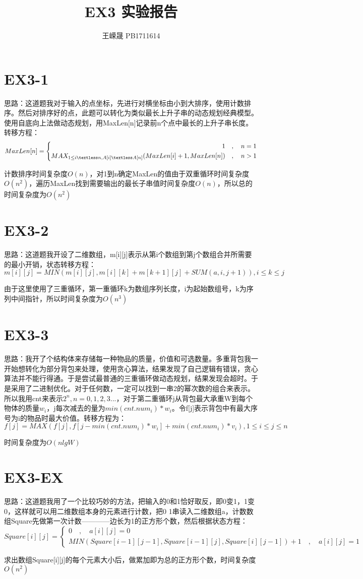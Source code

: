 \documentclass[11pt,a4paper]{article}
\title{EX3 实验报告}
\author{王嵘晟 \quad PB1711614}
\date{}
\begin{document}
	\maketitle
	\section*{EX3-1}
	\par{思路：这道题我对于输入的点坐标，先进行对横坐标由小到大排序，使用计数排序。然后对排序好的点，此题可以转化为类似最长上升子串的动态规划经典模型。使用自底向上法做动态规划，用MaxLen[n]记录前n个点中最长的上升子串长度。转移方程：}
	$$ MaxLen[n]=\left\{
	\begin{aligned}
	1\quad ,\quad n=1 \\
	MAX_{1\le i\textless n, A[i]\textless A[n]}(MaxLen[i]+1,MaxLen[n])\quad ,\quad n>1
	\end{aligned}
	\right.
	$$
	\par{计数排序时间复杂度$O(n)$，对1到n确定MaxLen的值由于双重循环时间复杂度$O(n^{2})$，遍历MaxLen找到需要输出的最长子串值时间复杂度$O(n)$，所以总的时间复杂度为$O(n^{2})$}
	\section*{EX3-2}
	\par{思路：这道题我开设了二维数组，m[i][j]表示从第i个数组到第j个数组合并所需要的最小开销，状态转移方程：}
	$$ m[i][j]=MIN(m[i][j],m[i][k]+m[k+1][j]+SUM(a,i,j+1)),i\le k\le j$$
	\par{由于这里使用了三重循环，第一重循环k为数组序列长度，i为起始数组号，k为序列中间指针，所以时间复杂度为$O(n^{3})$}
	\section*{EX3-3}
	\par{思路：我开了个结构体来存储每一种物品的质量，价值和可选数量。多重背包我一开始想转化为部分背包来处理，使用贪心算法，结果发现了自己逻辑有错误，贪心算法并不能行得通。于是尝试最普通的三重循环做动态规划，结果发现会超时。于是采用了二进制优化。对于任何数，一定可以找到一串2的幂次数的组合来表示。所以我用cnt来表示$2^{n},n=0,1,2,3...$，对于第二重循环j从背包最大承重W到每个物体的质量$w_{i}$，j每次减去的量为$min(cnt.num_{i})*w_{i}$。令f[j]表示背包中有最大序号为i的物品时最大价值。转移方程为：}
	$$f[j]=MAX(f[j],f[j-min(cnt.num_{i})*w_{i}]+min(cnt.num_{i})*v_{i}),1\le i\le j\le n$$
	\par{时间复杂度为$O(nlgW)$}
	\section*{EX3-EX}
	\par{思路：这道题我用了一个比较巧妙的方法，把输入的0和1恰好取反，即0变1，1变0，这样就可以用二维数组本身的元素进行计数，把0 1串读入二维数组a，计数数组Square先做第一次计数————边长为1的正方形个数，然后根据状态方程：}
	$$Square[i][j]=\left\{
	\begin{aligned}
	0\quad ,\quad a[i][j]=0 \\
	MIN(Square[i-1][j-1],Square[i-1][j],Square[i][j-1])+1\quad ,\quad a[i][j]=1
	\end{aligned}
	\right.$$
	\par{求出数组Square[i][j]的每个元素大小后，做累加即为总的正方形个数，时间复杂度$O(n^{2})$}
\end{document}

